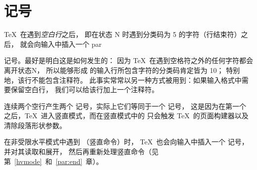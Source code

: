 \documentclass{book}
\begin{document}
\section{\protect{} 记号}

\TeX\ 在遇到{\em 空白行}之后，
即在状态 {\italic N} 时遇到分类码为 5 的字符（行结束符）之后，
就会向输入中插入一个 \csterm par\par 记号。最好是明白这是如何发生的：
因为 \TeX\ 在遇到空格符之外的任何字符都会离开状态{\italic N}，
所以能够形成  的输入行所包含字符的分类码肯定皆为 10；
特别地，该行不能包含注释符。
此事实常常以另一种方式被用到：如果输入格式中需要保留空白行，
我们可以给该行加上一个注释符。

连续两个空行产生两个  记号，实际上它们等同于一个  记号，
这是因为在第一个  之后，\TeX\ 进入竖直模式，而在竖直模式中的
 只会触发 \TeX\ 的页面构建器以及清除段落形状参数。

在非受限水平模式中遇到 （竖直命令）时，
\TeX\ 也会向输入中插入一个  记号，并对其读取和展开，
然后再重新处理竖直命令（见第~\ref{hvmode}~和~\ref{par:end}~章）。
\end{document}
